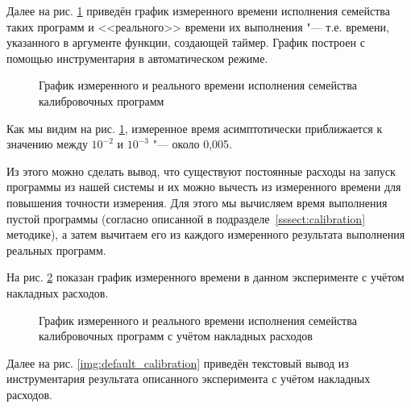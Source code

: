 Далее на рис. \ref{img:calibration} приведён график измеренного времени исполнения семейства таких программ и <<реального>> времени их выполнения "--- т.е. времени, указанного в аргументе функции, создающей таймер. График построен с помощью инструментария в автоматическом режиме.

\begin{figure}[p]
    \caption{График измеренного и реального времени исполнения семейства калибровочных программ}
    \label{img:calibration}
\end{figure}

Как мы видим на рис. \ref{img:calibration}, измеренное время асимптотически приближается к значению между $10^{-2}$ и $10^{-3}$ "--- около 0,005.

Из этого можно сделать вывод, что существуют постоянные расходы на запуск программы из нашей системы и их можно вычесть из измеренного времени для повышения точности измерения. Для этого мы вычисляем время выполнения пустой программы (согласно описанной в подразделе~\ref{sssect:calibration} методике), а затем вычитаем его из каждого измеренного результата выполнения реальных программ.

На рис. \ref{img:calibration-offset} показан график измеренного времени в данном эксперименте с учётом накладных расходов.

\begin{figure}[p]
    \caption{График измеренного и реального времени исполнения семейства калибровочных программ с учётом накладных расходов}
    \label{img:calibration-offset}
\end{figure}

Далее на рис. \ref{img:default_calibration} приведён текстовый вывод из инструментария результата описанного эксперимента с учётом накладных расходов.

